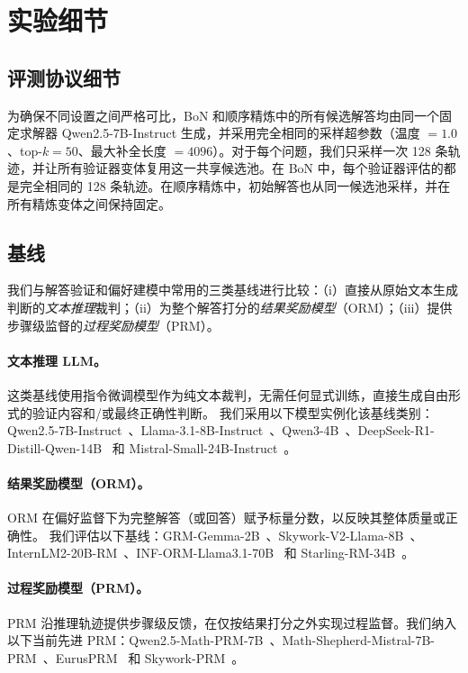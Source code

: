 \documentclass[11pt]{article}
\begin{document}
\section{实验细节}

\subsection{评测协议细节}
\label{sec:appendix_eval_protocol}

为确保不同设置之间严格可比，BoN 和顺序精炼中的所有候选解答均由同一个固定求解器 Qwen2.5-7B-Instruct 生成，并采用完全相同的采样超参数（温度 $=1.0$、top-$k=50$、最大补全长度 $=4096$）。对于每个问题，我们只采样一次 128 条轨迹，并让所有验证器变体复用这一共享候选池。在 BoN 中，每个验证器评估的都是完全相同的 128 条轨迹。在顺序精炼中，初始解答也从同一候选池采样，并在所有精炼变体之间保持固定。

\subsection{基线}
\label{sec:appendix_baselines}

我们与解答验证和偏好建模中常用的三类基线进行比较：（i）直接从原始文本生成判断的\emph{文本推理}裁判；（ii）为整个解答打分的\emph{结果奖励模型}（ORM）；（iii）提供步骤级监督的\emph{过程奖励模型}（PRM）。

\paragraph{文本推理 LLM。}
这类基线使用指令微调模型作为纯文本裁判，无需任何显式训练，直接生成自由形式的验证内容和/或最终正确性判断。
我们采用以下模型实例化该基线类别：Qwen2.5-7B-Instruct~\cite{Qwen2.5_Models}、Llama-3.1-8B-Instruct~\cite{Llama3_Models}、Qwen3-4B~\cite{Qwen3_Models}、DeepSeek-R1-Distill-Qwen-14B~\cite{Deepseek3_Models} 和 Mistral-Small-24B-Instruct~\cite{mistral-small-3-24b}。

\paragraph{结果奖励模型（ORM）。}
ORM 在偏好监督下为完整解答（或回答）赋予标量分数，以反映其整体质量或正确性。
我们评估以下基线：GRM-Gemma-2B~\cite{Gemma_2b_RM}、Skywork-V2-Llama-8B~\cite{Skywork_ORM_V2}、InternLM2-20B-RM~\cite{InternLM2}、INF-ORM-Llama3.1-70B~\cite{INF_ORM_Llama3.1_70B} 和 Starling-RM-34B~\cite{Starling-RM}。

\paragraph{过程奖励模型（PRM）。}
PRM 沿推理轨迹提供步骤级反馈，在仅按结果打分之外实现过程监督。我们纳入以下当前先进 PRM：Qwen2.5-Math-PRM-7B~\cite{Qwen_Math_PRM}、Math-Shepherd-Mistral-7B-PRM~\cite{Math-Shepherd-PRM}、EurusPRM~\cite{EurusPRM} 和 Skywork-PRM~\cite{Skywork_PRM}。
\end{document}
